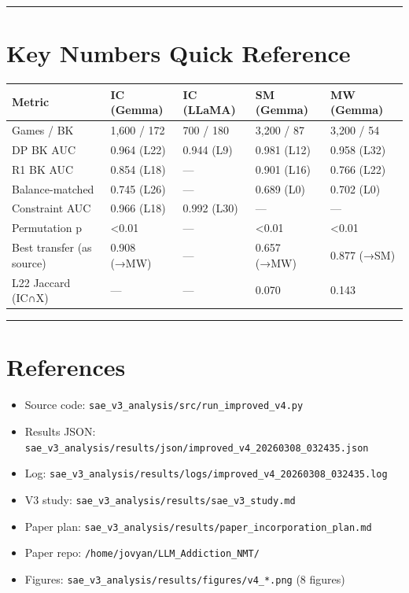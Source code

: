 \documentclass[11pt,a4paper]{article}
\begin{document}
\bigskip\hrule\bigskip

\section{Key Numbers Quick Reference}

\begin{table}[htbp]
\centering
\footnotesize
\begin{tabular}{|l|l|l|l|l|}
\hline
Metric & IC (Gemma) & IC (LLaMA) & SM (Gemma) & MW (Gemma) \\
\hline
Games / BK & 1,600 / 172 & 700 / 180 & 3,200 / 87 & 3,200 / 54 \\
DP BK AUC & 0.964 (L22) & 0.944 (L9) & 0.981 (L12) & 0.958 (L32) \\
R1 BK AUC & 0.854 (L18) & — & 0.901 (L16) & 0.766 (L22) \\
Balance-matched & 0.745 (L26) & — & 0.689 (L0) & 0.702 (L0) \\
Constraint AUC & 0.966 (L18) & 0.992 (L30) & — & — \\
Permutation p & <0.01 & — & <0.01 & <0.01 \\
Best transfer (as source) & 0.908 (→MW) & — & 0.657 (→MW) & 0.877 (→SM) \\
L22 Jaccard (IC∩X) & — & — & 0.070 & 0.143 \\
\hline
\end{tabular}
\end{table}

\bigskip\hrule\bigskip

\section{References}

\begin{itemize}
\item Source code: \texttt{sae_v3_analysis/src/run_improved_v4.py}
\end{itemize}
\begin{itemize}
\item Results JSON: \texttt{sae_v3_analysis/results/json/improved_v4_20260308_032435.json}
\end{itemize}
\begin{itemize}
\item Log: \texttt{sae_v3_analysis/results/logs/improved_v4_20260308_032435.log}
\end{itemize}
\begin{itemize}
\item V3 study: \texttt{sae_v3_analysis/results/sae_v3_study.md}
\end{itemize}
\begin{itemize}
\item Paper plan: \texttt{sae_v3_analysis/results/paper_incorporation_plan.md}
\end{itemize}
\begin{itemize}
\item Paper repo: \texttt{/home/jovyan/LLM_Addiction_NMT/}
\end{itemize}
\begin{itemize}
\item Figures: \texttt{sae_v3_analysis/results/figures/v4_*.png} (8 figures)
\end{itemize}
\end{document}
